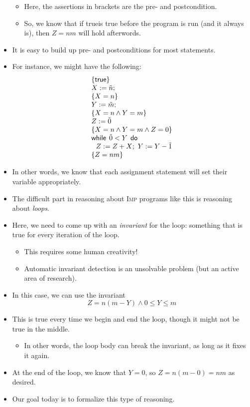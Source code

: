 \documentclass{lecturenotes}
\newcommand{\Imp}{\textsc{Imp}\xspace}
\newcommand{\itrue}{\textsf{true}}
\begin{document}
\begin{itemize}
\begin{itemize}
  \item Here, the assertions in brackets are the pre- and postcondition.
  \item So, we know that if \itrue is true before the program is run (and it always is), then $Z=nm$ will hold afterwords.
  \end{itemize}
\item It is easy to build up pre- and postconditions for most statements.
\item For instance, we might have the following:
  $$
  \begin{array}{l}
    \{ \itrue \}\\
    X := \tilde{n};\\
    \{X = n\}\\
    Y := \tilde{m};\\
    \{X = n \land Y = m\}\\
    Z := \tilde{0}\\
    \{X = n \land Y = m \land Z = 0\}\\
    \textsf{while}\mkern8mu\tilde{0} < Y\mkern8mu\textsf{do}\\
    ~~Z := Z + X;~Y := Y - \tilde{1}\\
    \{ Z = nm \}
  \end{array}
  $$
\item In other words, we know that each assignment statement will set their variable appropriately.
\item The difficult part in reasoning about \Imp programs like this is reasoning about \emph{loops}.
\item Here, we need to come up with an \emph{invariant} for the loop: something that is true for every iteration of the loop.
  \begin{itemize}
  \item This requires some human creativity! 
  \item Automatic invariant detection is an unsolvable problem (but an active area of research).
  \end{itemize}
\item In this case, we can use the invariant $$Z = n(m-Y) \land 0 \leq Y \leq m$$
\item This is true every time we begin and end the loop, though it might not be true in the middle.
  \begin{itemize}
  \item In other words, the loop body can break the invariant, as long as it fixes it again.
  \end{itemize}
\item At the end of the loop, we know that $Y = 0$, so $Z = n(m-0) = nm$ as desired.
\item Our goal today is to formalize this type of reasoning.
\end{itemize}
\end{document}
